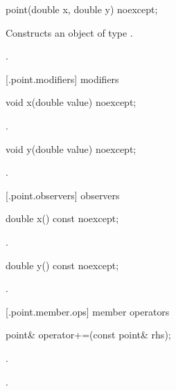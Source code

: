 \begin{itemdecl}
point(double x, double y) noexcept;
\end{itemdecl}
\begin{itemdescr}
	\pnum
	\effects
	Constructs an object of type .
	
	\pnum
	\postconditions
	.
\end{itemdescr}
	
 [\iotwod.point.modifiers]{ modifiers}

\begin{itemdecl}
void x(double value) noexcept;
\end{itemdecl}
\begin{itemdescr}
	\pnum
	\postconditions
	.
	
\end{itemdescr}

\begin{itemdecl}
    void y(double value) noexcept;
\end{itemdecl}
\begin{itemdescr}
	\pnum
	\postconditions
	.
	
\end{itemdescr}

 [\iotwod.point.observers]{ observers}

%
%
\begin{itemdecl}
    double x() const noexcept;
\end{itemdecl}
\begin{itemdescr}
	\pnum
	\returns
	.
\end{itemdescr}

%
%
\begin{itemdecl}
    double y() const noexcept;
\end{itemdecl}
\begin{itemdescr}
	\pnum
	\returns
	.
\end{itemdescr}

 [\iotwod.point.member.ops] { member operators}

%
%
\begin{itemdecl}
	point& operator+=(const point& rhs);
\end{itemdecl}
\begin{itemdescr}
	\pnum
	\effects
	.
	
	\pnum
	\returns
	.
\end{itemdescr}

